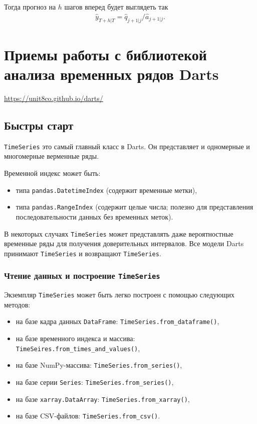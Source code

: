 \documentclass[%
	11pt,
	a4paper,
	utf8,
		]{article}
\begin{document}
Тогда прогноз на $ h $ шагов вперед будет выглядеть так
\begin{align*}
	\hat{y}_{T + h | T} = \hat{q}_{j + 1 | j} / \hat{a}_{j + 1 | j}.
\end{align*}





\section{Приемы работы с библиотекой анализа временных рядов Darts}

\url{https://unit8co.github.io/darts/}

\subsection{Быстры старт}

\verb|TimeSeries| это самый главный класс в Darts. Он представляет и одномерные и многомерные верменные ряды.

Временной индекс может быть:
\begin{itemize}
	\item типа \verb|pandas.DatetimeIndex| (содержит временные метки),
	
	\item типа \verb|pandas.RangeIndex| (содержит целые числа; полезно для представления последовательности данных без временных меток).
\end{itemize}

В некоторых случаях \verb|TimeSeries| может представлять даже вероятностные временные ряды для получения доверительных интервалов. Все модели Darts принимают \verb|TimeSeries| и возвращают \verb|TimeSeries|.

\subsubsection{Чтение данных и построение \texttt{TimeSeries}}

Экземпляр \verb|TimeSeries| может быть легко построен с помощью следующих методов:
\begin{itemize}
	\item на базе кадра данных \verb|DataFrame|: \verb|TimeSeries.from_dataframe()|,
	
	\item на базе временного индекса и массива: \verb|TimeSeires.from_times_and_values()|,
	
	\item на базе NumPy-массива: \verb|TimeSeries.from_series()|,
	
	\item на базе серии \verb|Series|: \verb|TimeSeries.from_series()|,
	
	\item на базе \verb|xarray.DataArray|: \verb|TimeSeries.from_xarray()|,
	
	\item на базе CSV-файлов: \verb|TimeSeries.from_csv()|.
\end{itemize}
\end{document}
